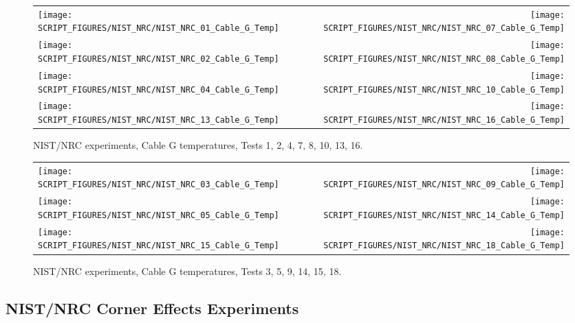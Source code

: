 \begin{figure}[p]
\begin{tabular*}{\textwidth}{l@{\extracolsep{\fill}}r}
\texttt{[image: SCRIPT\_FIGURES/NIST\_NRC/NIST\_NRC\_01\_Cable\_G\_Temp]} &
\texttt{[image: SCRIPT\_FIGURES/NIST\_NRC/NIST\_NRC\_07\_Cable\_G\_Temp]} \\
\texttt{[image: SCRIPT\_FIGURES/NIST\_NRC/NIST\_NRC\_02\_Cable\_G\_Temp]} &
\texttt{[image: SCRIPT\_FIGURES/NIST\_NRC/NIST\_NRC\_08\_Cable\_G\_Temp]} \\
\texttt{[image: SCRIPT\_FIGURES/NIST\_NRC/NIST\_NRC\_04\_Cable\_G\_Temp]} &
\texttt{[image: SCRIPT\_FIGURES/NIST\_NRC/NIST\_NRC\_10\_Cable\_G\_Temp]} \\
\texttt{[image: SCRIPT\_FIGURES/NIST\_NRC/NIST\_NRC\_13\_Cable\_G\_Temp]} &
\texttt{[image: SCRIPT\_FIGURES/NIST\_NRC/NIST\_NRC\_16\_Cable\_G\_Temp]}
\end{tabular*}
\caption[NIST/NRC experiments, Cable G temperatures, Tests 1, 2, 4, 7, 8, 10, 13, 16]{NIST/NRC experiments, Cable G temperatures, Tests 1, 2, 4, 7, 8, 10, 13, 16.}
\label{NIST_NRC_Cable_G_Closed}
\end{figure}

\begin{figure}[p]
\begin{tabular*}{\textwidth}{l@{\extracolsep{\fill}}r}
\texttt{[image: SCRIPT\_FIGURES/NIST\_NRC/NIST\_NRC\_03\_Cable\_G\_Temp]} &
\texttt{[image: SCRIPT\_FIGURES/NIST\_NRC/NIST\_NRC\_09\_Cable\_G\_Temp]} \\
\texttt{[image: SCRIPT\_FIGURES/NIST\_NRC/NIST\_NRC\_05\_Cable\_G\_Temp]} &
\texttt{[image: SCRIPT\_FIGURES/NIST\_NRC/NIST\_NRC\_14\_Cable\_G\_Temp]} \\
\texttt{[image: SCRIPT\_FIGURES/NIST\_NRC/NIST\_NRC\_15\_Cable\_G\_Temp]} &
\texttt{[image: SCRIPT\_FIGURES/NIST\_NRC/NIST\_NRC\_18\_Cable\_G\_Temp]}
\end{tabular*}
\caption[NIST/NRC experiments, Cable G temperatures, Tests 3, 5, 9, 14, 15, 18]{NIST/NRC experiments, Cable G temperatures, Tests 3, 5, 9, 14, 15, 18.}
\label{NIST_NRC_Cable_G_Open}
\end{figure}

\clearpage

\subsection{NIST/NRC Corner Effects Experiments}

